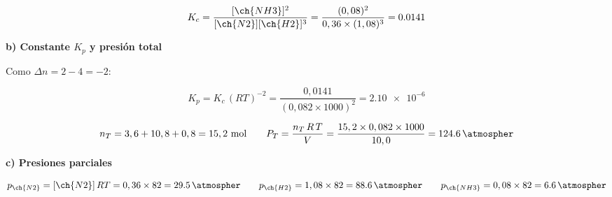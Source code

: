 \begin{exerciseEVAU}
\begin{solu}
        \begin{equation*}
            K_c = \dfrac{[\ch{NH3}]^2}{[\ch{N2}][\ch{H2}]^3} = \dfrac{(0,08)^2}{0,36 \times (1,08)^3} = \num{0.0141}
        \end{equation*}

        \textbf{b) Constante \(K_p\) y presión total}

        Como \(\Delta n = 2-4=-2\):

        \begin{equation*}
            K_p = K_c\, (RT)^{-2} = \dfrac{0,0141}{(0,082 \times 1000)^2} = \num{2.10e-6}
        \end{equation*}

        \begin{equation*}
            n_T = 3,6+10,8+0,8 = 15,2 \ \text{mol} \qquad P_T = \dfrac{n_T\, R\, T}{V} = \dfrac{15,2 \times 0,082 \times 1000}{10,0} = \SI{124.6}{\atmospher}
        \end{equation*}

        \textbf{c) Presiones parciales}

        \begin{equation*}
            p_{\ch{N2}} = [\ch{N2}]\, RT = 0,36 \times 82 = \SI{29.5}{\atmospher} \qquad p_{\ch{H2}} = 1,08 \times 82 = \SI{88.6}{\atmospher} \qquad p_{\ch{NH3}} = 0,08 \times 82 = \SI{6.6}{\atmospher}
        \end{equation*}

    \end{solu}

\end{exerciseEVAU}

